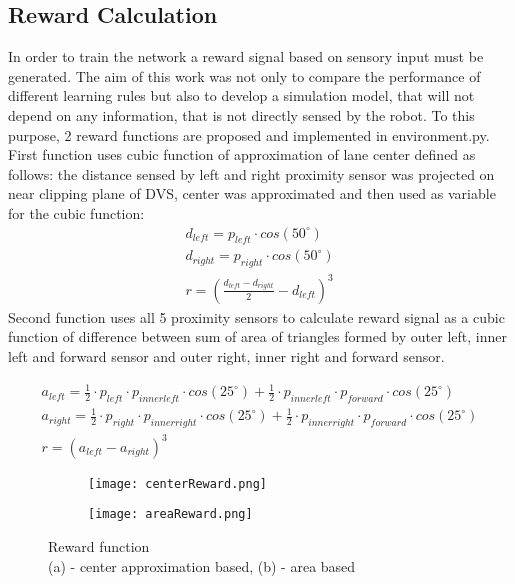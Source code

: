 \subsection{Reward Calculation}\label{rewardSig}
In order to train the network a reward signal based on sensory input must be generated. The aim of this work was not only to compare the performance of different learning rules but also to develop a simulation model, that will not depend on any information, that is not directly sensed by the robot. To this purpose, 2 reward functions are proposed and implemented in environment.py. First function uses cubic function of approximation of lane center defined as follows: the distance sensed by left and right proximity sensor was projected on near clipping plane of DVS, center was approximated and then used as variable for the cubic function:
\begin{gather}\label{eq:centerReward}
	d_{left} = p_{left} \cdot cos(50^\circ)\\
	d_{right} = p_{right} \cdot cos(50^\circ)\\
	r = (\frac{d_{left} - d_{right}}{2} - d_{left})^3
\end{gather}
Second function uses all 5 proximity sensors to calculate reward signal as a cubic function of difference between sum of area of triangles formed by outer left, inner left and forward sensor and outer right, inner right and forward sensor. 

\begin{gather}\label{eq:areaReward}
	a_{left} = \frac{1}{2} \cdot p_{left} \cdot p_{innerleft} \cdot cos(25^\circ) + \frac{1}{2} \cdot p_{innerleft} \cdot p_{forward} \cdot cos(25^\circ)\\
	a_{right} = \frac{1}{2} \cdot p_{right} \cdot p_{innerright} \cdot cos(25^\circ) + \frac{1}{2} \cdot p_{innerright} \cdot p_{forward} \cdot cos(25^\circ)\\
	r = (a_{left} - a_{right})^3
\end{gather}

\begin{figure*}[t!]
	\captionsetup{justification=centering}
	\centering
	\begin{subfigure}[t]{0.5\textwidth}
		\centering
		\texttt{[image: centerReward.png]} 
		\caption{}
	\end{subfigure}
	\begin{subfigure}[t]{0.4\textwidth}
		\texttt{[image: areaReward.png]}
		\caption{}
	\end{subfigure}
	\caption{Reward function \\(a) - center approximation based, (b) - area based \label{fig:reward}}  
\end{figure*}

